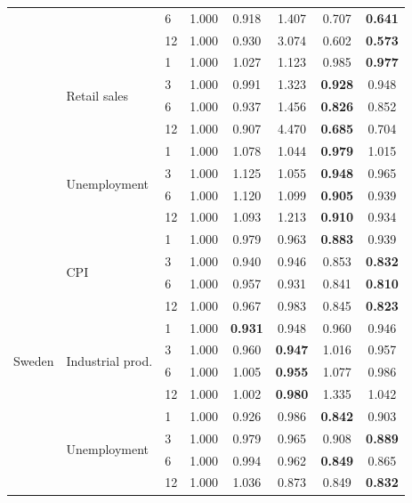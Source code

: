 \begin{tabular}{lllccccc}
 &  & 6 & 1.000 & 0.918 & 1.407 & 0.707 & \textbf{0.641} \\
 &  & 12 & 1.000 & 0.930 & 3.074 & 0.602 & \textbf{0.573} \\
 & \multirow{4}{*}{Retail sales} & 1 & 1.000 & 1.027 & 1.123 & 0.985 & \textbf{0.977} \\
 &  & 3 & 1.000 & 0.991 & 1.323 & \textbf{0.928} & 0.948 \\
 &  & 6 & 1.000 & 0.937 & 1.456 & \textbf{0.826} & 0.852 \\
 &  & 12 & 1.000 & 0.907 & 4.470 & \textbf{0.685} & 0.704 \\
 & \multirow{4}{*}{Unemployment} & 1 & 1.000 & 1.078 & 1.044 & \textbf{0.979} & 1.015 \\
 &  & 3 & 1.000 & 1.125 & 1.055 & \textbf{0.948} & 0.965 \\
 &  & 6 & 1.000 & 1.120 & 1.099 & \textbf{0.905} & 0.939 \\
 &  & 12 & 1.000 & 1.093 & 1.213 & \textbf{0.910} & 0.934 \\
\midrule
\multirow{12}{*}{Sweden} & \multirow{4}{*}{CPI} & 1 & 1.000 & 0.979 & 0.963 & \textbf{0.883} & 0.939 \\
 &  & 3 & 1.000 & 0.940 & 0.946 & 0.853 & \textbf{0.832} \\
 &  & 6 & 1.000 & 0.957 & 0.931 & 0.841 & \textbf{0.810} \\
 &  & 12 & 1.000 & 0.967 & 0.983 & 0.845 & \textbf{0.823} \\
 & \multirow{4}{*}{Industrial prod.} & 1 & 1.000 & \textbf{0.931} & 0.948 & 0.960 & 0.946 \\
 &  & 3 & 1.000 & 0.960 & \textbf{0.947} & 1.016 & 0.957 \\
 &  & 6 & 1.000 & 1.005 & \textbf{0.955} & 1.077 & 0.986 \\
 &  & 12 & 1.000 & 1.002 & \textbf{0.980} & 1.335 & 1.042 \\
 & \multirow{4}{*}{Unemployment} & 1 & 1.000 & 0.926 & 0.986 & \textbf{0.842} & 0.903 \\
 &  & 3 & 1.000 & 0.979 & 0.965 & 0.908 & \textbf{0.889} \\
 &  & 6 & 1.000 & 0.994 & 0.962 & \textbf{0.849} & 0.865 \\
 &  & 12 & 1.000 & 1.036 & 0.873 & 0.849 & \textbf{0.832} \\
\bottomrule
\end{tabular}
